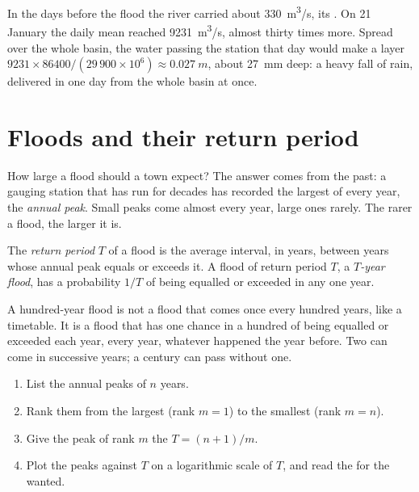 In the days before the flood the river carried about \qty{330}{m^3/s}, its
. On 21 January the daily mean reached \qty{9231}{m^3/s}, almost
thirty times more. Spread over the whole basin, the water passing the
station that day would make a layer
$9231 \times 86400 / (29\,900 \times 10^6) \approx \qty{0.027}{m}$, about
\qty{27}{mm} deep: a heavy fall of rain, delivered in one day from the whole
basin at once.

\section{Floods and their return period}

How large a flood should a town expect? The answer comes from the past: a
gauging station that has run for decades has recorded the largest 
of every year, the \emph{annual peak}. Small peaks come almost every year,
large ones rarely. The rarer a flood, the larger it is.

\begin{definition}\label{def:g10:drainage-basins:return-period}
The \emph{return period} $T$ of a flood is the average
interval, in years, between years whose annual peak equals or exceeds it. A
flood of return period $T$, a \emph{$T$-year flood}, has a probability $1/T$
of being equalled or exceeded in any one year.
\end{definition}

A hundred-year flood is not a flood that comes once every hundred years, like
a timetable. It is a flood that has one chance in a hundred of being equalled
or exceeded each year, every year, whatever happened the year before. Two can
come in successive years; a century can pass without one.

\begin{method}\label{met:g10:drainage-basins:return-periods}
\begin{enumerate}
  \item List the annual peaks of $n$ years.
  \item Rank them from the largest (rank $m = 1$) to the smallest
        (rank $m = n$).
  \item Give the peak of rank $m$ the  $T = (n + 1)/m$.
  \item Plot the peaks against $T$ on a logarithmic scale of $T$, and read
        the  for the  wanted.
\end{enumerate}
\end{method}

